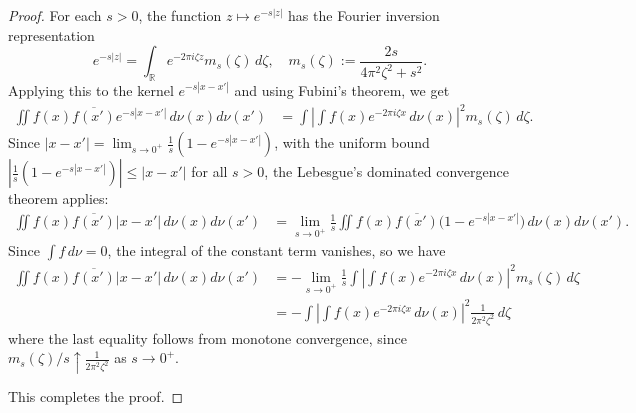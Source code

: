 \documentclass[sn-mathphys-num]{sn-jnl}%
\numberwithin{equation}{section}
\newcommand{\profile}{\psi}
\theoremstyle{thmstyleone}%
\theoremstyle{thmstyletwo}%
\theoremstyle{thmstylethree}%
\begin{document}
\begin{proof}
For each $s > 0$, the function $z \mapsto e^{-s|z|}$ has the Fourier inversion representation 
\[
    e^{-s|z|} = \int_{\mathbb{R}} e^{-2\pi i \zeta z} m_s(\zeta) \, d\zeta, \quad 
    m_s(\zeta) := \frac{2s}{4\pi^2 \zeta^2 + s^2}.
\]
Applying this to the kernel $e^{-s|x - x'|}$ and using Fubini's theorem, we get
\begin{equation*}
\begin{split} 
    \iint f(x) \overline{f(x')} e^{-s|x - x'|} \, d\nu(x) d\nu(x') 
    &= \int \left| \int f(x) e^{-2\pi i \zeta x} \, d\nu(x) \right|^2 m_s(\zeta) \, d\zeta.
\end{split} 
\end{equation*}
Since $|x-x'| = \lim_{s \to 0^+} \frac{1}{s} (1-e^{-s|x-x'|})$, with the uniform bound $|\frac{1}{s} (1-e^{-s|x-x'|})| \le |x-x'|$
for all $s > 0$,  the Lebesgue's dominated convergence theorem applies:
\begin{equation*}
\begin{split} 
    \iint f(x) \overline{f(x')} |x - x'| \, d\nu(x) d\nu(x')
   & = \lim_{s \to 0^+} \frac{1}{s} \iint f(x) \overline{f(x')} \big(1 - e^{-s|x - x'|} \big) \, d\nu(x) d\nu(x').
\end{split} 
\end{equation*}
Since $\int f \, d\nu = 0$, the integral of the constant term vanishes, so we have
\begin{equation*}
\begin{split} 
  \iint f(x) \overline{f(x')} |x - x'| \, d\nu(x) d\nu(x') &= -\lim_{s \to 0^+} \frac{1}{s} \int \left| \int f(x) e^{-2\pi i \zeta x} \, d\nu(x) \right|^2 m_s(\zeta) \, d\zeta \\
&= -\int \left| \int f(x) e^{-2\pi i \zeta x} \, d\nu(x) \right|^2 \frac{1}{2\pi^2 \zeta^2} \, d\zeta
\end{split} 
\end{equation*} 
where the last equality follows from monotone convergence, since $m_s(\zeta)/s \uparrow \frac{1}{2\pi^2 \zeta^2}$ as $s \to 0^+$. 

This completes the proof. 
\end{proof}
\end{document}
